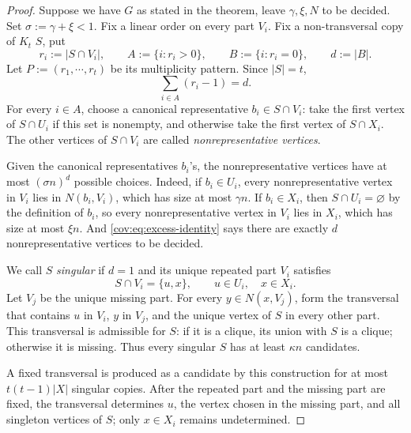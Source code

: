 \documentclass[10pt,a4paper]{amsart}
\begin{document}
\begin{proof}
Suppose we have \(G\) as stated in the theorem, leave \(\gamma, \xi, N\) to be decided. 
Set \(\sigma:=\gamma+\xi<1\). Fix a linear order on every part \(V_i\).
Fix a non-transversal copy of \(K_t\) \(S\), put
\begin{equation*}
r_i:=|S\cap V_i|,
\qquad
A:=\{i:r_i>0\},
\qquad
B:=\{i:r_i=0\},
\qquad
d:=|B|.
\end{equation*}
Let \(P:=(r_1,\cdots,r_t)\) be its multiplicity pattern. Since \(|S|=t\),
\begin{equation}\label{cov:eq:excess-identity}
\sum_{i\in A}(r_i-1)=d.
\end{equation}
For every \(i\in A\), choose a canonical representative \(b_i\in S\cap V_i\):
take the first vertex of \(S\cap U_i\) if this set is nonempty, and otherwise
take the first vertex of \(S\cap X_i\). The other vertices of \(S\cap V_i\) are called \emph{nonrepresentative vertices}.

Given the canonical representatives \(b_i\)'s, the nonrepresentative vertices have at most \((\sigma n)^d\)
possible choices. Indeed, if \(b_i\in U_i\), every nonrepresentative vertex in \(V_i\) lies in \(N(b_i,V_i)\),
which has size at most \(\gamma n\). If \(b_i\in X_i\), then \(S\cap U_i=\varnothing\) by the definition of \(b_i\),
so every nonrepresentative vertex in \(V_i\) lies in \(X_i\), which has size at most \(\xi n\).
And \eqref{cov:eq:excess-identity} says there are exactly \(d\) nonrepresentative vertices to be decided.

We call \(S\) \emph{singular} if \(d=1\) and its unique repeated part \(V_i\) satisfies
\begin{equation*}
S\cap V_i=\{u,x\},
\qquad u\in U_i,
\quad x\in X_i.
\end{equation*}
Let \(V_j\) be the unique missing part. For every \(y\in N(x,V_j)\), form the transversal that
contains \(u\) in \(V_i\), \(y\) in \(V_j\), and the unique vertex of \(S\) in every other part.
This transversal is admissible for \(S\): if it is a clique, its union with \(S\) is a clique;
otherwise it is missing. Thus every singular \(S\) has at least \(\kappa n\) candidates.

A fixed transversal is produced as a candidate by this construction for at most \(t(t-1)|X|\) singular copies.
After the repeated part and the missing part are fixed, the transversal determines \(u\), the vertex chosen
in the missing part, and all singleton vertices of \(S\); only \(x\in X_i\) remains undetermined.


\end{proof}
\end{document}
